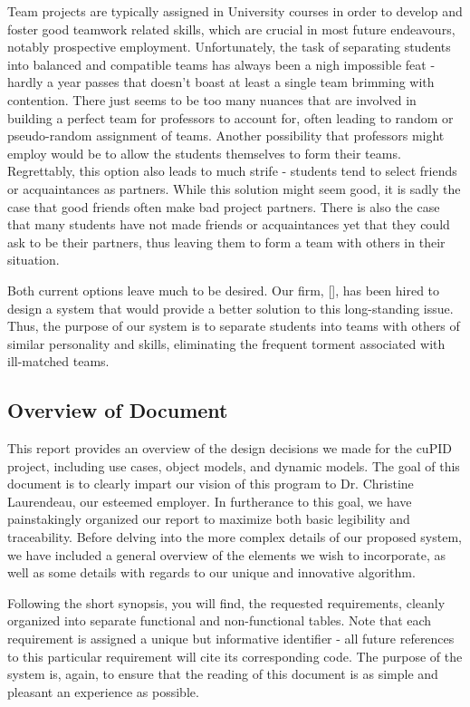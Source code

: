 \documentclass[12pt,letterpaper]{article}
\begin{document}
Team projects are typically assigned in University courses in order to develop and foster
good teamwork related skills, which are crucial in most future endeavours, notably 
prospective employment. Unfortunately, the task of separating students into balanced 
and compatible teams has always been a nigh impossible feat - hardly a year passes that doesn't
boast at least a single team brimming with  contention. There just seems to be too many
nuances that are involved in building a perfect team for professors to account for, often leading
to random or pseudo-random assignment of teams. Another possibility that professors might employ
would be to allow the students themselves to form their teams. Regrettably, this option also
leads to much strife - students tend to select friends or acquaintances as partners. While this
solution might seem good, it is sadly the case that good friends often make bad project partners. 
There is also the case that many students have not made friends or acquaintances yet that they 
could ask to be their partners, thus leaving them to form a team with others in their situation.

Both current options leave much to be desired. Our firm, [\teamname{}], has been hired
to design a system that would provide a better solution to this long-standing issue. Thus, the purpose of
our system is to separate students into teams with others of similar personality and skills, eliminating 
the frequent torment associated with ill-matched teams.

\subsection{Overview of Document}

This report provides an overview of the design decisions we made for the cuPID project, including 
use cases, object models, and dynamic models. The goal of this document is to clearly impart our vision of this
program to Dr. Christine Laurendeau, our esteemed employer. In furtherance to this goal, we have painstakingly 
organized our report to maximize both basic legibility and traceability. Before delving into the more complex details 
of our proposed system, we have included a general overview of the elements we wish to incorporate, as well as 
some details with regards to our unique and innovative algorithm.

Following the short synopsis, you will find, the requested requirements, cleanly organized into separate functional 
and non-functional tables. Note that each requirement is assigned a unique but informative identifier - all future references
to this particular requirement will cite its corresponding code. The purpose of the system is, again, to ensure that the
reading of this document is as simple and pleasant an experience as possible. 
\end{document}
